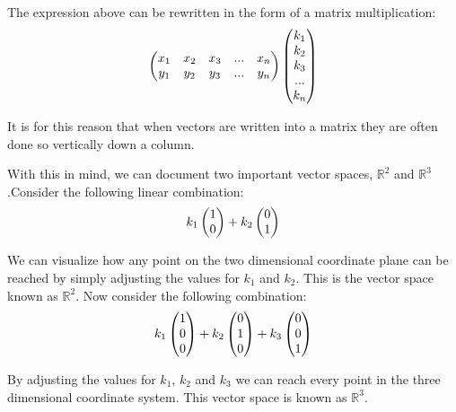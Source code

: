 \documentclass{article}
\begin{document}
\newline
\par \noindent The expression above can be rewritten in the form of a matrix multiplication:
\newline
\[
\left(\begin{array}{@{}ccccc@{}}
	x_1 & x_2 & x_3 &... &x_n\\
	y_1 & y_2 & y_3 & ... &y_n\\
	
\end{array}\right) 
\left(\begin{array}{@{}c@{}}
	k_1 \\
	k_2 \\
	k_3 \\
	... \\
	k_n
\end{array}\right) 
\]
\newline
\par \noindent It is for this reason that when vectors are written into a matrix they are often done so vertically down a column.
\newline
\par \noindent With this in mind, we can document two important vector spaces, \(\mathbb{R}^2\)  and \(\mathbb{R}^3\).Consider the following linear combination:
\newline
\[
k_1
\left(\begin{array}{@{}c@{}}
	1 \\
	0 \\
\end{array}\right) + 
k_2
\left(\begin{array}{@{}c@{}}
	0 \\
	1 \\
\end{array}\right)
\]
\newline
\par \noindent We can visualize how any point on the two dimensional coordinate plane can be reached by simply adjusting the values for \(k_1\) and \(k_2\). This is the vector space known as \( \mathbb{R}^2 \). Now consider the following combination:
\newline
\[
k_1
\left(\begin{array}{@{}c@{}}
	1 \\
	0 \\
	0 
\end{array}\right) + 
k_2
\left(\begin{array}{@{}c@{}}
	0 \\
	1 \\
	0
\end{array}\right) +
k_3
\left(\begin{array}{@{}c@{}}
	0 \\
	0 \\
	1
\end{array}\right)
\]
\newline
\par \noindent By adjusting the values for \(k_1\), \(k_2\) and \(k_3\) we can reach every point in the three dimensional coordinate system. This vector space is known as \(\mathbb{R}^3\).
\end{document}
